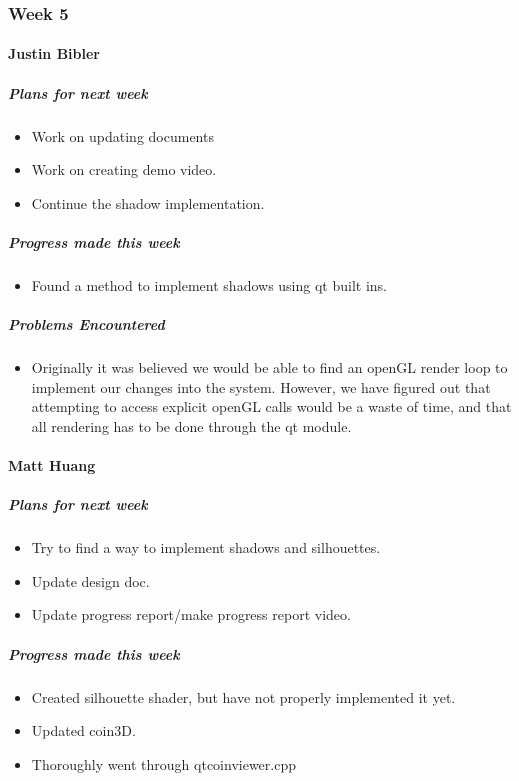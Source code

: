 {
\subsubsection{Week 5}
\paragraph{Justin Bibler}
\subparagraph{Plans for next week}
\begin{itemize}
  \item Work on updating documents
  \item Work on creating demo video.
  \item Continue the shadow implementation.
\end{itemize}

\subparagraph{Progress made this week}
\begin{itemize}
  \item Found a method to implement shadows using qt built ins.
\end{itemize}

\subparagraph{Problems Encountered}
\begin{itemize}
  \item Originally it was believed we would be able to find an openGL render loop to implement our changes into the system. However, we have figured out that attempting to access explicit openGL calls would be a waste of time, and that all rendering has to be done through the qt module.
\end{itemize}
\vspace{3mm}

\paragraph{Matt Huang}
\subparagraph{Plans for next week}
\begin{itemize}
  \item Try to find a way to implement shadows and silhouettes.
  \item Update design doc.
  \item Update progress report/make progress report video.
\end{itemize}

\subparagraph{Progress made this week}
\begin{itemize}
  \item Created silhouette shader, but have not properly implemented it yet.
  \item Updated coin3D.
  \item Thoroughly went through qtcoinviewer.cpp
\end{itemize}

}
